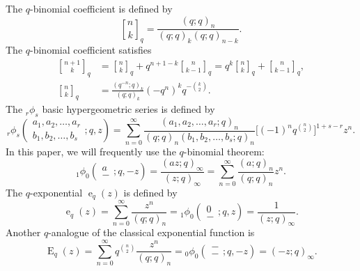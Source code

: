 \documentclass{cimart}
\newcommand{\qbinom}{\genfrac{[}{]}{0pt}{}}
\DeclareMathOperator{\ope}{e}
\DeclareMathOperator{\opE}{E}
\begin{document}
The $q$-binomial coefficient is defined by
\begin{equation*}
\qbinom{n}{k}_{q}=\frac{(q;q)_{n}}{(q;q)_{k}(q;q)_{n-k}}.
\end{equation*}
The $q$-binomial coefficient satisfies
\begin{align}
    \qbinom{n+1}{k}_{q}&=\qbinom{n}{k}_{q}+q^{n+1-k}\qbinom{n}{k-1}_{q}=
    q^{k}\qbinom{n}{k}_{q}+\qbinom{n}{k-1}_{q},\label{eqn_pascal}\\
    \qbinom{n}{k}_{q}&=\frac{(q^{-n};q)_{k}}{(q;q)_{k}}(-q^n)^{k}q^{-\binom{k}{2}}.\nonumber
\end{align}
The ${}_r\phi_{s}$ basic hypergeometric series is defined by
\begin{equation*}
    {}_r\phi_{s}\left(
    \begin{array}{c}
         a_{1},a_{2},\ldots,a_{r} \\
         b_{1},b_{2},\ldots,b_{s}
    \end{array}
    ;q,z
    \right)=\sum_{n=0}^{\infty}\frac{(a_{1},a_{2},\ldots,a_{r};q)_{n}}{(q;q)_{n}(b_{1},b_{2},\ldots,b_{s};q)_{n}}\Big[(-1)^{n}q^{\binom{n}{2}}\Big]^{1+s-r}z^n.
\end{equation*}
In this paper, we will frequently use the $q$-binomial theorem:
\begin{equation}\label{eqn_qbin_the}
    {}_1\phi_{0}\left(\begin{array}{c}
         a\\
         - 
    \end{array};q,-z\right)=\frac{(az;q)_{\infty}}{(z;q)_{\infty}}=\sum_{n=0}^{\infty}\frac{(a;q)_{n}}{(q;q)_{n}}z^{n}.
\end{equation}
The $q$-exponential $\ope_{q}(z)$ is defined by
\begin{equation*}
    \ope_{q}(z)=\sum_{n=0}^{\infty}\frac{z^n}{(q;q)_{n}}={}_1\phi_{0}\left(\begin{array}{c}
         0\\
         - 
    \end{array};q,z\right)=\frac{1}{(z;q)_{\infty}}.
\end{equation*}
Another $q$-analogue of the classical exponential function is
\begin{equation*}
    \opE_{q}(z)=\sum_{n=0}^{\infty}q^{\binom{n}{2}}\frac{z^n}{(q;q)_{n}}={}_0\phi_{0}\left(\begin{array}{c}
         -\\
         - 
    \end{array};q,-z\right)=(-z;q)_{\infty}.
\end{equation*}
\end{document}
